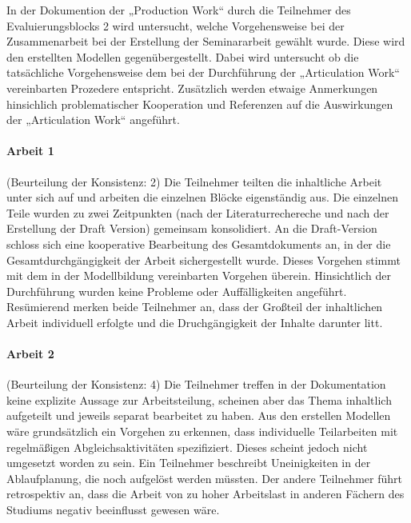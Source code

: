 In der Dokumention der „Production Work“ durch die Teilnehmer des Evaluierungsblocks 2 wird untersucht, welche Vorgehensweise bei der Zusammenarbeit bei der Erstellung der Seminararbeit gewählt wurde. Diese wird den erstellten Modellen gegenübergestellt. Dabei wird untersucht ob die tatsächliche Vorgehensweise dem bei der Durchführung der „Articulation Work“ vereinbarten Prozedere entspricht. Zusätzlich werden etwaige Anmerkungen hinsichlich problematischer Kooperation und Referenzen auf die Auswirkungen der „Articulation Work“ angeführt.

\paragraph{Arbeit 1} %
\label{par:arbeit_1}

(Beurteilung der Konsistenz: 2) Die Teilnehmer teilten die inhaltliche Arbeit unter sich auf und arbeiten die einzelnen Blöcke eigenständig aus. Die einzelnen Teile wurden zu zwei Zeitpunkten (nach der Literaturrechereche und nach der Erstellung der Draft Version) gemeinsam konsolidiert. An die Draft-Version schloss sich eine kooperative Bearbeitung des Gesamtdokuments an, in der die Gesamtdurchgängigkeit der Arbeit sichergestellt wurde. Dieses Vorgehen stimmt mit dem in der Modellbildung vereinbarten Vorgehen überein. Hinsichtlich der Durchführung wurden keine Probleme oder Auffälligkeiten angeführt. Resümierend merken beide Teilnehmer an, dass der Großteil der inhaltlichen Arbeit individuell erfolgte und die Druchgängigkeit der Inhalte darunter litt.


\paragraph{Arbeit 2} %
\label{par:arbeit_2}

(Beurteilung der Konsistenz: 4) Die Teilnehmer treffen in der Dokumentation keine explizite Aussage zur Arbeitsteilung, scheinen aber das Thema inhaltlich aufgeteilt und jeweils separat bearbeitet zu haben. Aus den erstellen Modellen wäre grundsätzlich ein Vorgehen zu erkennen, dass individuelle Teilarbeiten mit regelmäßigen Abgleichsaktivitäten spezifiziert. Dieses scheint jedoch nicht umgesetzt worden zu sein. Ein Teilnehmer beschreibt Uneinigkeiten in der Ablaufplanung, die noch aufgelöst werden müssten. Der andere Teilnehmer führt retrospektiv an, dass die Arbeit von zu hoher Arbeitslast in anderen Fächern des Studiums negativ beeinflusst gewesen wäre.  

